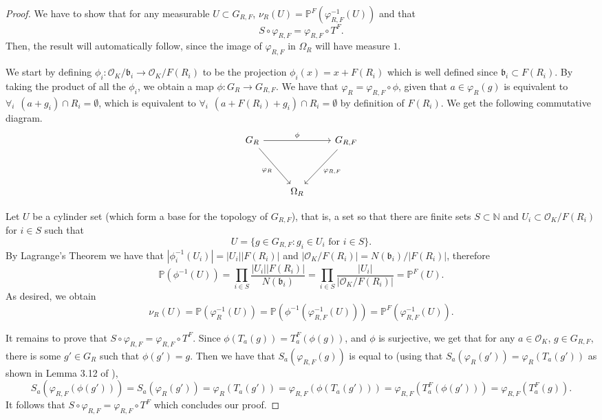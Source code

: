 \documentclass[a4paper,11pt,reqno]{amsart}
\theoremstyle{plain}
\theoremstyle{remark}
\newcommand{\co}{\mathcal{O}}
\newcommand{\gb}{\mathfrak{b}}
\newcommand{\grf}{G_{R,F}}
\newcommand{\vrf}{\varphi_{R,F}}
\newcommand{\mmp}{\mathbb{P}}
\begin{document}
			\begin{proof}
				
				We have to show that for any measurable $U \subset \grf$, $\nu_R(U) = \mmp^F(\vrf^{-1}(U))$ and that $$S \circ \vrf = \vrf \circ T^F.$$ Then, the result will automatically follow, since the image of $\vrf$ in $\Omega_R$ will have measure $1$.
				
				We start by defining $\phi_i:\co_K/\gb_i \rightarrow \co_K/F(R_i)$ to be the projection $\phi_i(x) = x+F(R_i)$ which is well defined since $\gb_i \subset F(R_i)$.  By taking the product of all the $\phi_i$, we obtain a map $\phi:G_R \rightarrow \grf $. We have that $\varphi_R = \vrf \circ  \phi$,  given that $a \in \varphi_R(g)$ is equivalent to $ \forall_i \hspace{5pt} (a+ g_i) \cap R_i = \emptyset$,  which is equivalent to $ \forall_i \hspace{5pt} (a+F(R_i) + g_i) \cap R_i = \emptyset$ by definition of $F(R_i)$. We get the following commutative diagram. 
				\[\begin{tikzcd}
					G_R && \grf \\
					\\
					& {\Omega_R}
					\arrow["\phi", from=1-1, to=1-3]
					\arrow["{\varphi_R}"', from=1-1, to=3-2]
					\arrow["\vrf", from=1-3, to=3-2]
				\end{tikzcd}\]
				
				Let $U$ be a cylinder set (which form a  base for the topology of $\grf$), that is, a set so that there are finite sets $S \subset \mathbb{N}$ and $U_i \subset \co_K/F(R_i)$ for $i \in S$ such that $$U = \{g \in \grf: g_i \in U_i \text{ for } i \in S\}.$$  By Lagrange's Theorem we have that $|\phi_i^{-1}(U_i)| = |U_i||F(R_i)|$ and $|\co_K/F(R_i)| = N(\gb_i)/|F(R_i)|$, therefore $$\mmp(\phi^{-1}(U)) = \prod_{i \in S} \frac{|U_i||F(R_i)|}{N(\gb_i)} = \prod_{i \in S} \frac{|U_i|}{|\co_K/F(R_i)|} = \mmp^F(U).  $$
				As desired, we obtain $$\nu_R(U) = \mmp(\varphi_{R}^{-1}(U)) = \mmp(\phi^{-1}(\vrf^{-1}(U))) = \mmp^F(\vrf^{-1}(U)).$$ 
				
				It remains to prove that $S \circ \vrf = \vrf \circ T^F$. Since $\phi(T_a(g)) = T^F_a(\phi(g))$, and $\phi$ is surjective, we get that for any $a \in \co_K$, $g \in \grf$, there is some $g' \in G_R$ such that $\phi(g') = g$. Then we have that $S_a(\vrf(g))$ is equal to (using that $S_a(\varphi_R(g')) = \varphi_{R}(T_a(g'))$ as shown in Lemma 3.12 of \cite{part1}), $$ S_a(\vrf(\phi(g'))) = S_a(\varphi_R(g')) = \varphi_{R}(T_a(g')) = \vrf(\phi(T_a(g'))) = \vrf(T_a^F(\phi(g'))) = \vrf(T_a^F(g)). $$ It follows that $S \circ \vrf = \vrf \circ T^F$ which concludes our proof.
			\end{proof}
			
\end{document}
